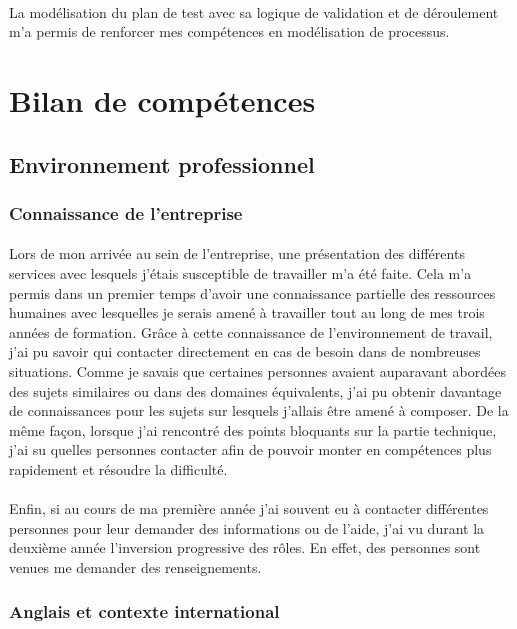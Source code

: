 \documentclass[12pt,a4paper]{report}
\begin{document}
\paragraph*{} La modélisation du plan de test avec sa logique de validation et de
déroulement m’a permis de renforcer mes compétences en modélisation de processus.

\newpage
\section{Bilan de compétences} 
\subsection{Environnement professionnel}
\subsubsection{Connaissance de l'entreprise}
\paragraph*{}Lors de mon arrivée au sein de l'entreprise, une présentation des différents services avec lesquels j'étais susceptible de travailler m'a été faite. Cela m'a permis dans un premier temps d'avoir une connaissance partielle des ressources humaines avec lesquelles je serais amené à travailler tout au long de mes trois années de formation. Grâce à cette connaissance de l'environnement de travail, j'ai pu savoir qui contacter directement en cas de besoin dans de nombreuses situations. Comme je savais que certaines personnes avaient auparavant abordées des sujets similaires ou dans des domaines équivalents, j'ai pu obtenir davantage de connaissances pour les sujets sur lesquels j'allais être amené à composer. De la même façon, lorsque j'ai rencontré des points bloquants sur la partie technique, j'ai su quelles personnes contacter afin de pouvoir monter en compétences plus rapidement et  résoudre la difficulté.
\paragraph*{}Enfin, si au cours de ma première année j'ai souvent eu à contacter différentes personnes pour leur demander des informations ou de l'aide, j'ai vu durant la deuxième année l'inversion progressive des rôles. En effet, des personnes sont venues me demander des renseignements. \\
\subsubsection{Anglais et contexte international}
\end{document}
